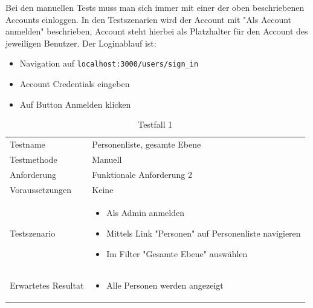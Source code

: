 Bei den manuellen Tests muss man sich immer mit einer der oben beschriebenen Accounts einloggen.
In den Testszenarien wird der Account mit "Als {Account} anmelden" beschrieben, {Account} steht hierbei als
Platzhalter für den Account des jeweiligen Benutzer. Der Loginablauf ist:

\begin{itemize}
   \item Navigation auf \texttt{localhost:3000/users/sign\_in}
   \item Account Credentials eingeben
   \item Auf Button Anmelden klicken
\end{itemize}

\newpage

\begin{table}[h!]
   \begin{tabular}{|L{0.4\textwidth}|L{0.6\textwidth}|}
       \hline
         \\[12pt]
       \hline
        Testname & Personenliste, gesamte Ebene \\
       \hline
       Testmethode & Manuell \\
       \hline
        Anforderung & Funktionale Anforderung 2 \\
       \hline
       Voraussetzungen & Keine \\
       \hline
       Testszenario & 
       \begin{itemize}
         \item Als Admin anmelden
         \item Mittels Link "Personen" auf Personenliste navigieren
         \item Im Filter "Gesamte Ebene" auswählen
       \end{itemize} \\
       \hline
       Erwartetes Resultat & 
       \begin{itemize}
         \item Alle Personen werden angezeigt
      \end{itemize} \\
      \hline
     \end{tabular}
     \caption{Testfall 1}
\end{table}

\newpage

